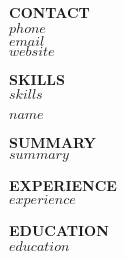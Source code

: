 \documentclass[11pt,a4paper]{article}
\begin{document}
\pagestyle{empty}

\begin{minipage}[t]{0.35\textwidth}
\colorbox{sidebarcolor}{%
\begin{minipage}{\textwidth}
\color{white}
\vspace{1em}
\textbf{\large CONTACT}\\[0.5em]
$phone$\\
$email$\\
$website$
\vspace{1em}

\textbf{\large SKILLS}\\[0.5em]
$skills$
\vspace{1em}
\end{minipage}
}
\end{minipage}%
\hfill
\begin{minipage}[t]{0.6\textwidth}
{\Huge\bfseries\color{namecolor} $name$}

\vspace{1em}
\textbf{SUMMARY}\\[0.3em]
$summary$

\vspace{1em}
\textbf{EXPERIENCE}\\[0.3em]
$experience$

\vspace{1em}
\textbf{EDUCATION}\\[0.3em]
$education$
\end{minipage}
\end{document}
